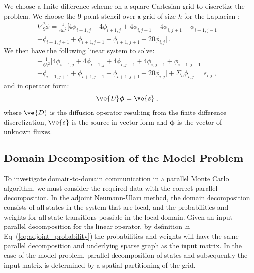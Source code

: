 \documentclass[preprint,11pt]{elsarticle}
\begin{document}
We choose a finite difference scheme on a square Cartesian grid to discretize
the problem. We choose the 9-point stencil over a grid of size $h$ for the
Laplacian \cite{leveque_finite_2007}:
\begin{multline}
  \nabla^2_9\phi = \frac{1}{6h^2}[4 \phi_{i-1,j} + 4 \phi_{i+1,j}
    + 4 \phi_{i,j-1} + 4 \phi_{i,j+1} + \phi_{i-1,j-1}\\ +
    \phi_{i-1,j+1} + \phi_{i+1,j-1} + \phi_{i+1,j+1} - 20
    \phi_{i,j}]\:.
  \label{eq:nine_point_stencil}
\end{multline}
We then have the following linear system to solve:
\begin{multline}
  -\frac{1}{6h^2}[4 \phi_{i-1,j} + 4 \phi_{i+1,j} + 4
    \phi_{i,j-1} + 4 \phi_{i,j+1} + \phi_{i-1,j-1}\\ + \phi_{i-1,j+1}
    + \phi_{i+1,j-1} + \phi_{i+1,j+1} - 20 \phi_{i,j}] + \Sigma_a
  \phi_{i,j} = s_{i,j}\:,
  \label{eq:fd_system}
\end{multline}
and in operator form:
\begin{equation}
  \ve{D}\boldsymbol{\phi}=\ve{s}\:,
  \label{eq:operator_system}
\end{equation}
where $\ve{D}$ is the diffusion operator resulting from the finite difference
discretization, $\ve{s}$ is the source in vector form and $\boldsymbol{\phi}$
is the vector of unknown fluxes.

\subsection{Domain Decomposition of the Model Problem}
\label{subsec:model_problem_decomp}
To investigate domain-to-domain communication in a parallel Monte Carlo
algorithm, we must consider the required data with the correct parallel
decomposition. In the adjoint Neumann-Ulam method, the domain decomposition
consists of all states in the system that are local, and the probabilities and
weights for all state transitions possible in the local domain. Given an input
parallel decomposition for the linear operator, by definition in
Eq~(\ref{eq:adjoint_probability}) the probabilities and weights will have the
same parallel decomposition and underlying sparse graph as the input
matrix. In the case of the model problem, parallel decomposition of states and
subsequently the input matrix is determined by a spatial partitioning of the
grid.
\end{document}
